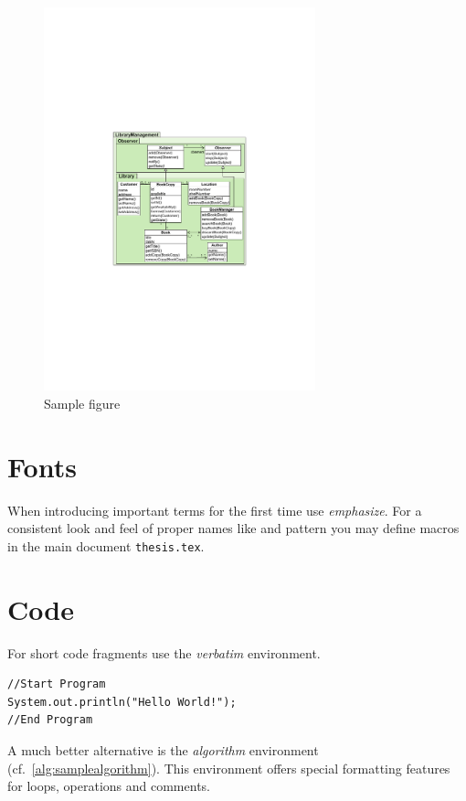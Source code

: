 \begin{figure}[tb]
	\centering
	\includegraphics[width=0.7\textwidth]{figures/figure1}
	\caption{Sample figure}
	\label{fig:samplefigure_pdf}
\end{figure}


\section{Fonts}

When introducing important terms for the first time use \emph{emphasize}.
For a consistent look and feel of proper names like \cd and 
pattern you may define macros in the main document \texttt{thesis.tex}.

\section{Code}

For short code fragments use the \textit{verbatim} environment.

\begin{verbatim}
//Start Program
System.out.println("Hello World!");
//End Program
\end{verbatim}

A much better alternative is the \textit{algorithm} environment (cf.\
\cref{alg:samplealgorithm}).
This environment offers special formatting features for loops, operations and
comments.

